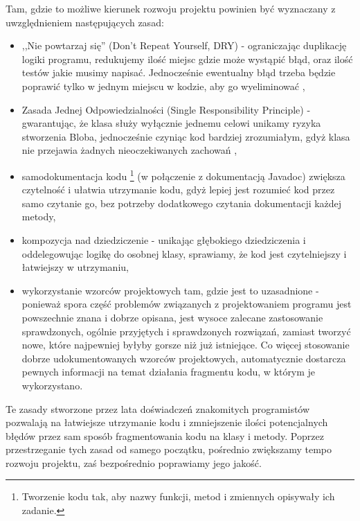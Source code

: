 \documentclass[polish,12pt,titlepage]{article}
\begin{document}
Tam, gdzie to możliwe kierunek rozwoju projektu powinien być wyznaczany
z uwzględnieniem następujących zasad:
\begin{itemize}
  \item ,,Nie powtarzaj się'' (Don't Repeat Yourself, DRY) - ograniczając
    duplikację logiki programu, redukujemy ilość miejsc gdzie może wystąpić
    błąd, oraz ilość testów jakie musimy napisać. Jednocześnie ewentualny błąd
    trzeba będzie poprawić tylko w jednym miejscu w kodzie, aby go
    wyeliminować \cite{DRY},
  \item Zasada Jednej Odpowiedzialności (Single Responsibility Principle) - 
    gwarantując, że klasa służy wyłącznie jednemu celowi unikamy ryzyka
    stworzenia Bloba, jednocześnie czyniąc kod bardziej zrozumiałym, gdyż
    klasa nie przejawia żadnych nieoczekiwanych zachowań \cite{OOD},
  \item samodokumentacja kodu \footnote{Tworzenie kodu tak, aby nazwy funkcji, 
    metod i zmiennych opisywały ich zadanie.} (w połączenie z dokumentacją 	
    Javadoc) zwiększa czytelność i ułatwia utrzymanie kodu, gdyż lepiej jest
    rozumieć kod przez samo czytanie go, bez potrzeby dodatkowego czytania
    dokumentacji każdej metody,
  \item kompozycja nad dziedziczenie - unikając głębokiego dziedziczenia
    i oddelegowując logikę do osobnej klasy, sprawiamy, że kod jest
    czytelniejszy i łatwiejszy w utrzymaniu,
  \item wykorzystanie wzorców projektowych tam, gdzie jest to uzasadnione - 
    ponieważ spora część problemów związanych z projektowaniem programu jest
    powszechnie znana i dobrze opisana, jest wysoce zalecane zastosowanie
    sprawdzonych, ogólnie przyjętych i sprawdzonych rozwiązań, zamiast tworzyć
    nowe, które najpewniej byłyby gorsze niż już istniejące. Co więcej
    stosowanie dobrze udokumentowanych wzorców projektowych, automatycznie
    dostarcza pewnych informacji na temat działania fragmentu kodu,
    w którym je wykorzystano.
\end{itemize}

Te zasady stworzone przez lata doświadczeń znakomitych programistów pozwalają
na łatwiejsze utrzymanie kodu i zmniejszenie ilości potencjalnych błędów przez
sam sposób fragmentowania kodu na klasy i metody. Poprzez przestrzeganie tych
zasad od samego początku, pośrednio zwiększamy tempo rozwoju projektu, zaś
bezpośrednio poprawiamy jego jakość.
\end{document}
